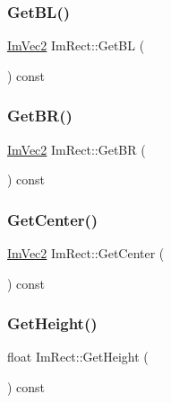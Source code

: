 \subsubsection{\texorpdfstring{Get\+B\+L()}{GetBL()}}
{\footnotesize\ttfamily \hyperlink{structImVec2}{Im\+Vec2} Im\+Rect\+::\+Get\+BL (\begin{DoxyParamCaption}{ }\end{DoxyParamCaption}) const\hspace{0.3cm}{\ttfamily [inline]}}

\mbox{\label{structImRect_ad2f2687254beed5a9b19bde0d6fa14f5}} 
\subsubsection{\texorpdfstring{Get\+B\+R()}{GetBR()}}
{\footnotesize\ttfamily \hyperlink{structImVec2}{Im\+Vec2} Im\+Rect\+::\+Get\+BR (\begin{DoxyParamCaption}{ }\end{DoxyParamCaption}) const\hspace{0.3cm}{\ttfamily [inline]}}

\mbox{\label{structImRect_aae13f8003184fd84f29d27c3c074cf43}} 
\subsubsection{\texorpdfstring{Get\+Center()}{GetCenter()}}
{\footnotesize\ttfamily \hyperlink{structImVec2}{Im\+Vec2} Im\+Rect\+::\+Get\+Center (\begin{DoxyParamCaption}{ }\end{DoxyParamCaption}) const\hspace{0.3cm}{\ttfamily [inline]}}

\mbox{\label{structImRect_a748d8ae9cb26508951ec6e2f2df0625b}} 
\subsubsection{\texorpdfstring{Get\+Height()}{GetHeight()}}
{\footnotesize\ttfamily float Im\+Rect\+::\+Get\+Height (\begin{DoxyParamCaption}{ }\end{DoxyParamCaption}) const\hspace{0.3cm}{\ttfamily [inline]}}

